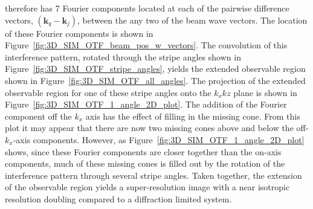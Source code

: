 therefore has 7 Fourier components located at each of the pairwise
difference vectors, $\left(\textbf{k}_{q}-\textbf{k}_{j}\right)$, 
between the any two of the beam wave vectors. The location of these 
Fourier components is shown in 
Figure~\ref{fig:3D_SIM_OTF_beam_pos_w_vectors}. The convolution of 
this interference pattern, rotated through the stripe angles shown
in Figure~\ref{fig:3D_SIM_OTF_stripe_angles}, yields the extended
observable region shown in Figure~\ref{fig:3D_SIM_OTF_all_angles}.
The projection of the extended observable region for one of these 
stripe angles onto the $k_{x}k{z}$ plane is shown in 
Figure~\ref{fig:3D_SIM_OTF_1_angle_2D_plot}. The addition of the
Fourier component off the $k_{x}$ axis has the effect of filling 
in the missing cone. From this plot it may appear that there are
now two missing cones above and below the off-$k_{x}$-axis components.
However, as Figure~\ref{fig:3D_SIM_OTF_1_angle_2D_plot} shows, 
since these Fourier components are closer together than the
on-axis components, much of these missing cones is filled out by 
the rotation of the interference pattern through several stripe
angles. Taken together, the extension of the observable region 
yields a super-resolution image with a near isotropic resolution 
doubling compared to a diffraction limited 
system\cite{gustafsson2008three}.


